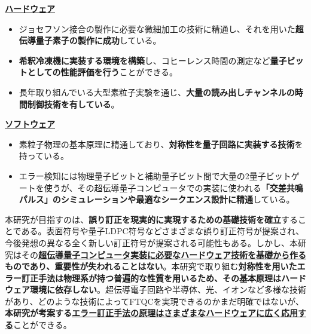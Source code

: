 \documentclass[11pt,a4j,dvipdfmx]{jarticle} 					%
\newcommand{\研究課題名}{誤り耐性量子コンピュータに向けた誤り訂正技術の開発(仮)}
\newcommand{\研究機関名}{東京大学}
\newcommand{\研究代表者氏名}{寺師弘二}
\newcommand{\研究期間の最終元号年度}{10}  %
\newcommand{\mybf}[1]{{\bfseries\sffamily#1}}
\newcommand{\maruone}{\raise0.2mm\hbox{\textcircled{\scriptsize{1}}}}
\begin{document}
\underline{\bf ハードウェア}\vspace{-2mm}
\begin{itemize}
\item ジョセフソン接合の製作に必要な微細加工の技術に精通し、それを用いた\mybf{超伝導量子素子の製作に成功}している。\vspace{-2mm}
\item \mybf{希釈冷凍機に実装する環境を構築}し、コヒーレンス時間の測定など\mybf{量子ビットとしての性能評価を行う}ことができる。\vspace{-2mm}
\item 長年取り組んでいる大型素粒子実験を通じ、\mybf{大量の読み出しチャンネルの時間制御技術を有している}。
\end{itemize}

\underline{\bf ソフトウェア}\vspace{-2mm}
\begin{itemize}
\item 素粒子物理の基本原理に精通しており、\mybf{対称性を量子回路に実装する技術}を持っている。\vspace{-2mm}
\item エラー検知には物理量子ビットと補助量子ビット間で大量の2量子ビットゲートを使うが、その超伝導量子コンピュータでの実装に使われる\mybf{「交差共鳴パルス」のシミュレーションや最適なシークエンス設計に精通}している。
\end{itemize}

本研究が目指すのは、\mybf{誤り訂正を現実的に実現するための基礎技術を確立}することである。表面符号や量子LDPC符号などさまざまな誤り訂正符号が提案され、今後発想の異なる全く新しい訂正符号が提案される可能性もある。しかし、本研究はその\mybf{\ul{超伝導量子コンピュータ実装に必要なハードウェア技術を基礎から作る}ものであり、重要性が失われることはない}。本研究で取り組む\mybf{対称性を用いたエラー訂正手法は物理系が持つ普遍的な性質を用いるため、その基本原理はハードウェア環境に依存しない}。超伝導電子回路や半導体、光、イオンなど多様な技術があり、どのような技術によってFTQCを実現できるのかまだ明確ではないが、\mybf{本研究が考案する\ul{エラー訂正手法の原理はさまざまなハードウェアに広く応用する}}ことができる。\\


\\
\noindent \mybf{\ul{\maruone\ 物理問題の設定}}
\end{document}
